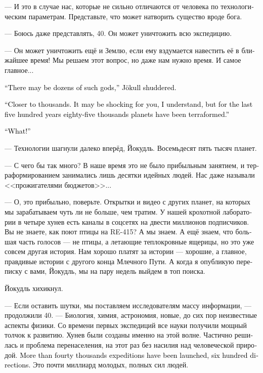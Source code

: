 \documentclass[a4paper,12pt,fleqn]{book}\usepackage{cooltooltips}\usepackage{polyglossia}\setdefaultlanguage[babelshorthands=true]{russian}\setotherlanguage{english}\defaultfontfeatures{Ligatures=TeX,Mapping=tex-text} \usepackage{xcolor}\definecolor{lightgray}{HTML}{bbbbbb}\color{lightgray}\newcommand{\ml}[3]{\textenglish{\textcolor{black}{#3}}}
\begin{document}
--- И это в случае нас, которые не сильно отличаются от человека по технологическим параметрам.
Представьте, что может натворить существо вроде бога.

--- Боюсь даже представлять, 40.
Он может уничтожить всю экспедицию.

--- Он может уничтожить ещё и Землю, если ему вздумается навестить её в ближайшее время!
Мы решаем этот вопрос, но даже нам нужно время.
И самое главное...

\ml{$0$}
{--- Таких богов могут быть десятки, --- Йокудль вздрогнул.}
{``There may be dozens of such gods,'' Jökull shuddered.}

\ml{$0$}
{--- Ближе к тысячам.}
{``Closer to thousands.}
\ml{$0$}
{Я понимаю, что для вас это может быть шок, но за последние 500 лет были терраформированы восемьдесят пять тысяч планет.}
{It may be shocking for you, I understand, but for the last five hundred years eighty-five thousands planets have been terraformed.''}

\ml{$0$}
{--- Сколько?!}
{``What!''}

--- Технологии шагнули далеко вперёд, Йокудль.
Восемьдесят пять тысяч планет.

--- С чего бы так много?
В наше время это не было прибыльным занятием, и терраформированием занимались лишь десятки идейных людей.
Нас даже называли <<прожигателями бюджетов>>...

--- О, это прибыльно, поверьте.
Открытки и видео с других планет, на которых мы зарабатываем чуть ли не больше, чем тратим.
У нашей крохотной лаборатории в четыре хунев есть каналы в соцсетях на двести миллионов подписчиков.
Вы не знаете, как поют птицы на RE-415?
А мы знаем.
А ещё знаем, что большая часть голосов --- не птицы, а летающие теплокровные ящерицы, но это уже совсем другая история.
Нам хорошо платят за истории --- хорошие, а главное, правдивые истории с другого конца Млечного Пути.
А когда я опубликую переписку с вами, Йокудль, мы на пару недель выйдем в топ поиска.

Йокудль хихикнул.

--- Если оставить шутки, мы поставляем исследователям массу информации, --- продолжили 40.
--- Биология, химия, астрономия, новые, до сих пор неизвестные аспекты физики.
Со времени первых экспедиций все науки получили мощный толчок к развитию.
Хунев были созданы именно на этой волне.
Частично решилась и проблема перенаселения, на этот раз без насилия над человеческой природой.
\ml{$0$}
{Запущены более сорока тысяч экспедиций в шестиста направлениях.}
{More than fourty thousands expeditions have been launched, six hundred directions.}
Это почти миллиард молодых, полных сил людей.
\end{document}
